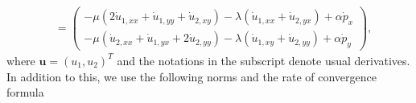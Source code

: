 \documentclass{amsart}
\begin{document}
\begin{align}
	\nonumber &= \begin{pmatrix}
		-\mu(2\dot{u}_{1,xx} + \dot{u}_{1,yy} + \dot{u}_{2,xy}) - \lambda (\dot{u}_{1,xx} + \dot{u}_{2,yx}) + \alpha \dot{p}_{x} \\ - \mu(\dot{u}_{2,xx} + \dot{u}_{1,yx} + 2\dot{u}_{2,yy}) - \lambda (\dot{u}_{1,xy} + \dot{u}_{2,yy}) + \alpha \dot{p}_{y}
	\end{pmatrix},
\end{align} 
%
where $\boldsymbol{u} = (u_1,u_2)^{T}$ and the notations in the subscript denote usual derivatives. In addition to this, we use the following norms and the rate of convergence formula 
\end{document}
